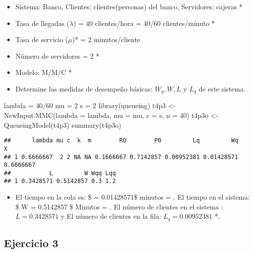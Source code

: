 \documentclass[
]{article}
\newenvironment{Shaded}{\begin{snugshade}}{\end{snugshade}}
\newcommand{\AttributeTok}[1]{\textcolor[rgb]{0.77,0.63,0.00}{#1}}
\newcommand{\DecValTok}[1]{\textcolor[rgb]{0.00,0.00,0.81}{#1}}
\newcommand{\FunctionTok}[1]{\textcolor[rgb]{0.00,0.00,0.00}{#1}}
\newcommand{\NormalTok}[1]{#1}
\newcommand{\OtherTok}[1]{\textcolor[rgb]{0.56,0.35,0.01}{#1}}
\newcommand{\SpecialCharTok}[1]{\textcolor[rgb]{0.00,0.00,0.00}{#1}}
\providecommand{\tightlist}{%
  \setlength{\itemsep}{0pt}\setlength{\parskip}{0pt}}
\begin{document}
\begin{itemize}
\item
  Sistema: Banco, Clientes: clientes(personas) del banco, Servidores:
  cajeras *
\item
  Tasa de llegadas (\(\lambda\)) = 40 clientes/hora = 40/60
  clientes/minuto *
\item
  Tasa de servicio (\(\mu\))* = 2 minutos/cliente
\item
  Número de servidores = 2 *
\item
  Modelo: M/M/C *
\item
  Determine las medidas de desempeño básicas: \(W_q, W, L\) y \(L_q\) de
  este sistema.
\end{itemize}

\begin{Shaded}
\begin{Highlighting}[]
\NormalTok{lambda }\OtherTok{=} \DecValTok{40}\SpecialCharTok{/}\DecValTok{60}
\NormalTok{mu }\OtherTok{=} \DecValTok{2}
\NormalTok{s }\OtherTok{=} \DecValTok{2}
\FunctionTok{library}\NormalTok{(queueing)}
\NormalTok{t4p3 }\OtherTok{\textless{}{-}} \FunctionTok{NewInput.MMC}\NormalTok{(}\AttributeTok{lambda =}\NormalTok{ lambda, }\AttributeTok{mu =}\NormalTok{ mu, }\AttributeTok{c =}\NormalTok{ s, }\AttributeTok{n =} \DecValTok{40}\NormalTok{)}
\NormalTok{t4p3o }\OtherTok{\textless{}{-}} \FunctionTok{QueueingModel}\NormalTok{(t4p3)}
\FunctionTok{summary}\NormalTok{(t4p3o)}
\end{Highlighting}
\end{Shaded}

\begin{verbatim}
##      lambda mu c  k  m        RO        P0         Lq         Wq         X
## 1 0.6666667  2 2 NA NA 0.1666667 0.7142857 0.00952381 0.01428571 0.6666667
##           L         W Wqq Lqq
## 1 0.3428571 0.5142857 0.3 1.2
\end{verbatim}

\begin{itemize}
\tightlist
\item
  El tiempo en la cola es: \$ = 0.01428571\$ minutos = . El tiempo en el
  sistema: \$ W = 0.5142857 \$ Minutos = . El número de clientes en el
  sistema : \(L = 0.3428571\) y El número de clientes en la fila:
  \(L_q = 0.00952381\) *.
\end{itemize}

\hypertarget{ejercicio-3}{%
\subsection{Ejercicio 3}\label{ejercicio-3}}
\end{document}
